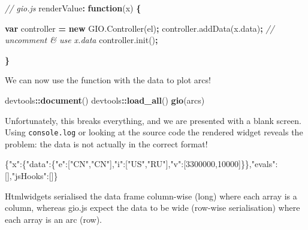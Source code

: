 \documentclass[
]{krantz}
\makeatletter
\newenvironment{Shaded}{\begin{snugshade}}{\end{snugshade}}
\newcommand{\AttributeTok}[1]{\textcolor[rgb]{0.61,0.61,0.61}{#1}}
\newcommand{\CommentTok}[1]{\textcolor[rgb]{0.37,0.37,0.37}{\textit{#1}}}
\newcommand{\DataTypeTok}[1]{\textcolor[rgb]{0.27,0.27,0.27}{#1}}
\newcommand{\DecValTok}[1]{\textcolor[rgb]{0.06,0.06,0.06}{#1}}
\newcommand{\FunctionTok}[1]{\textcolor[rgb]{0,0,0}{#1}}
\newcommand{\KeywordTok}[1]{\textcolor[rgb]{0.27,0.27,0.27}{\textbf{#1}}}
\newcommand{\NormalTok}[1]{#1}
\newcommand{\OperatorTok}[1]{\textcolor[rgb]{0.43,0.43,0.43}{\textbf{#1}}}
\newcommand{\OtherTok}[1]{\textcolor[rgb]{0.37,0.37,0.37}{#1}}
\newcommand{\StringTok}[1]{\textcolor[rgb]{0.5,0.5,0.5}{#1}}
\newcommand{\VariableTok}[1]{\textcolor[rgb]{0,0,0}{#1}}
\newenvironment{kframe}{%
\medskip{}
\setlength{\fboxsep}{.8em}
 \def\at@end@of@kframe{}%
 \ifinner\ifhmode%
  \def\at@end@of@kframe{\end{minipage}}%
  \begin{minipage}{\columnwidth}%
 \fi\fi%
 \def\FrameCommand##1{\hskip\@totalleftmargin \hskip-\fboxsep
 \colorbox{shadecolor}{##1}\hskip-\fboxsep
     \hskip-\linewidth \hskip-\@totalleftmargin \hskip\columnwidth}%
 \MakeFramed {\advance\hsize-\width
   \@totalleftmargin\z@ \linewidth\hsize
   \@setminipage}}%
 {\par\unskip\endMakeFramed%
 \at@end@of@kframe}
\renewenvironment{Shaded}{\begin{kframe}}{\end{kframe}}
\makeatother
\begin{document}
\begin{Shaded}
\begin{Highlighting}[]
\CommentTok{// gio.js}
\NormalTok{renderValue}\OperatorTok{:} \KeywordTok{function}\NormalTok{(x) }\OperatorTok{\{}

  \KeywordTok{var}\NormalTok{ controller }\OperatorTok{=} \KeywordTok{new} \VariableTok{GIO}\NormalTok{.}\AttributeTok{Controller}\NormalTok{(el)}\OperatorTok{;}
  \VariableTok{controller}\NormalTok{.}\AttributeTok{addData}\NormalTok{(}\VariableTok{x}\NormalTok{.}\AttributeTok{data}\NormalTok{)}\OperatorTok{;} \CommentTok{// uncomment \& use x.data}
  \VariableTok{controller}\NormalTok{.}\AttributeTok{init}\NormalTok{()}\OperatorTok{;}

\OperatorTok{\}}
\end{Highlighting}
\end{Shaded}

We can now use the function with the data to plot arcs!

\begin{Shaded}
\begin{Highlighting}[]
\NormalTok{devtools}\OperatorTok{::}\KeywordTok{document}\NormalTok{()}
\NormalTok{devtools}\OperatorTok{::}\KeywordTok{load\_all}\NormalTok{()}
\KeywordTok{gio}\NormalTok{(arcs)}
\end{Highlighting}
\end{Shaded}

Unfortunately, this breaks everything, and we are presented with a blank screen. Using \texttt{console.log} or looking at the source code the rendered widget reveals the problem: the data is not actually in the correct format!

\begin{Shaded}
\begin{Highlighting}[]
\FunctionTok{\{}\DataTypeTok{"x"}\FunctionTok{:\{}\DataTypeTok{"data"}\FunctionTok{:\{}\DataTypeTok{"e"}\FunctionTok{:}\OtherTok{[}\StringTok{"CN"}\OtherTok{,}\StringTok{"CN"}\OtherTok{]}\FunctionTok{,}\DataTypeTok{"i"}\FunctionTok{:}\OtherTok{[}\StringTok{"US"}\OtherTok{,}\StringTok{"RU"}\OtherTok{]}\FunctionTok{,}\DataTypeTok{"v"}\FunctionTok{:}\OtherTok{[}\DecValTok{3300000}\OtherTok{,}\DecValTok{10000}\OtherTok{]}\FunctionTok{\}\},}\DataTypeTok{"evals"}\FunctionTok{:}\OtherTok{[]}\FunctionTok{,}\DataTypeTok{"jsHooks"}\FunctionTok{:}\OtherTok{[]}\FunctionTok{\}}
\end{Highlighting}
\end{Shaded}

Htmlwidgets serialised the data frame column-wise (long) where each array is a column, whereas gio.js expect the data to be wide (row-wise serialisation) where each array is an arc (row).
\end{document}
